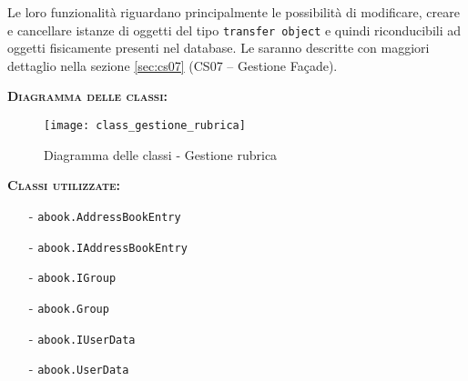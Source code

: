 \begin{description}
Le loro funzionalità riguardano principalmente le possibilità di modificare, creare e cancellare istanze di oggetti del tipo \texttt{transfer object} e quindi riconducibili ad oggetti fisicamente presenti nel database. Le  saranno descritte con maggiori dettaglio nella sezione \vref{sec:cs07} (\textsf{CS07 -- Gestione Façade}).

	\item{\scshape\bfseries Diagramma delle classi:}
\begin{figure}[H]
  \centering
  \texttt{[image: class\_gestione\_rubrica]}
  \caption{Diagramma delle classi - Gestione rubrica}\label{fig:gestionerubrica}
\end{figure}
	
	\item{\scshape\bfseries Classi utilizzate:}\\
	\begin{itemize}[nolistsep, noitemsep]
	  \item[-] \texttt{abook.AddressBookEntry}
	  \item[-] \texttt{abook.IAddressBookEntry}
	  \item[-] \texttt{abook.IGroup}
	  \item[-] \texttt{abook.Group}
	  \item[-] \texttt{abook.IUserData}
	  \item[-] \texttt{abook.UserData}
	\end{itemize}
\end{description}


